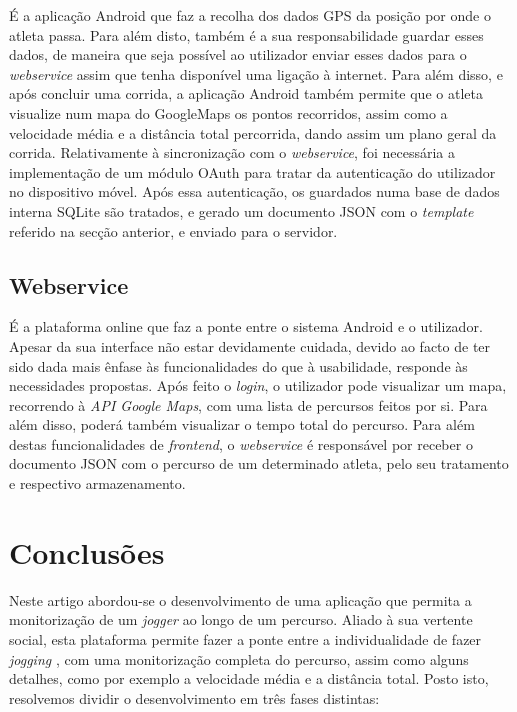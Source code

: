 \documentclass[twocolumn,twoside,10pt,a4paper]{article}
\begin{document}
É a aplicação Android que faz a recolha dos dados GPS da posição por onde o atleta passa. Para além disto, também é a sua responsabilidade guardar esses dados, de maneira que seja possível ao utilizador enviar esses dados para o \textit{webservice} assim que tenha disponível uma ligação à internet. Para além disso, e após concluir uma corrida, a aplicação Android também permite que o atleta visualize num mapa do GoogleMaps os pontos recorridos, assim como a velocidade média e a distância total percorrida, dando assim um plano geral da corrida. 
Relativamente à sincronização com o \textit{webservice}, foi necessária a implementação de um módulo OAuth para tratar da autenticação do utilizador no dispositivo móvel. Após essa autenticação, os guardados numa base de dados interna SQLite são tratados, e gerado um documento JSON com o \textit{template} referido na secção anterior, e enviado para o servidor.

\subsection{Webservice}

É a plataforma online que faz a ponte entre o sistema Android e o utilizador. Apesar da sua interface não estar devidamente cuidada, devido ao facto de ter sido dada mais ênfase às funcionalidades do que à usabilidade, responde às necessidades propostas. Após feito o \textit{login}, o utilizador pode visualizar um mapa, recorrendo à \emph{API Google Maps}, com uma lista de percursos feitos por si. Para além disso, poderá também visualizar o tempo total do percurso.
Para além destas funcionalidades de \textit{frontend}, o \textit{webservice} é responsável por receber o documento JSON com o percurso de um determinado atleta, pelo seu tratamento e respectivo armazenamento. 


\section{Conclusões}\label{sec:conclusions}

Neste artigo abordou-se o desenvolvimento de uma aplicação que permita a monitorização de um \textit{jogger} ao longo de um percurso. Aliado à sua vertente social, esta plataforma permite fazer a ponte entre a individualidade de fazer \textit{jogging} , com uma monitorização completa do percurso, assim como alguns detalhes, como por exemplo a velocidade média e a distância total.
Posto isto, resolvemos dividir o desenvolvimento em três fases distintas:
\end{document}

